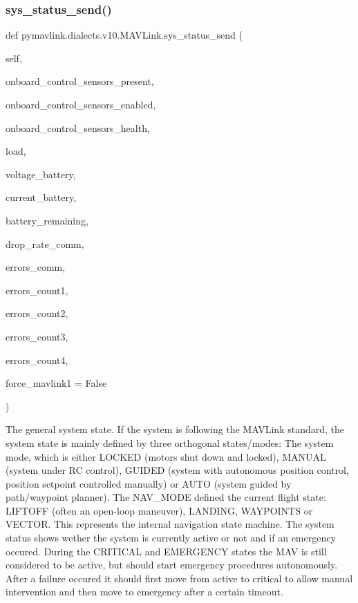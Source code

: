 \begin{DoxyVerb}
\begin{DoxyVerb}
\begin{DoxyVerb}
\begin{DoxyVerb}
\begin{DoxyVerb}
\begin{DoxyVerb}
\begin{DoxyVerb}
\begin{DoxyVerb}
\begin{DoxyVerb}
\begin{DoxyVerb}
\subsubsection{\texorpdfstring{sys\+\_\+status\+\_\+send()}{sys\_status\_send()}}
{\footnotesize\ttfamily def pymavlink.\+dialects.\+v10.\+M\+A\+V\+Link.\+sys\+\_\+status\+\_\+send (\begin{DoxyParamCaption}\item[{}]{self,  }\item[{}]{onboard\+\_\+control\+\_\+sensors\+\_\+present,  }\item[{}]{onboard\+\_\+control\+\_\+sensors\+\_\+enabled,  }\item[{}]{onboard\+\_\+control\+\_\+sensors\+\_\+health,  }\item[{}]{load,  }\item[{}]{voltage\+\_\+battery,  }\item[{}]{current\+\_\+battery,  }\item[{}]{battery\+\_\+remaining,  }\item[{}]{drop\+\_\+rate\+\_\+comm,  }\item[{}]{errors\+\_\+comm,  }\item[{}]{errors\+\_\+count1,  }\item[{}]{errors\+\_\+count2,  }\item[{}]{errors\+\_\+count3,  }\item[{}]{errors\+\_\+count4,  }\item[{}]{force\+\_\+mavlink1 = {\ttfamily False} }\end{DoxyParamCaption})}

\begin{DoxyVerb}The general system state. If the system is following the MAVLink
standard, the system state is mainly defined by three
orthogonal states/modes: The system mode, which is
either LOCKED (motors shut down and locked), MANUAL
(system under RC control), GUIDED (system with
autonomous position control, position setpoint
controlled manually) or AUTO (system guided by
path/waypoint planner). The NAV_MODE defined the
current flight state: LIFTOFF (often an open-loop
maneuver), LANDING, WAYPOINTS or VECTOR. This
represents the internal navigation state machine. The
system status shows wether the system is currently
active or not and if an emergency occured. During the
CRITICAL and EMERGENCY states the MAV is still
considered to be active, but should start emergency
procedures autonomously. After a failure occured it
should first move from active to critical to allow
manual intervention and then move to emergency after a
certain timeout.


\end{DoxyVerb}
\end{DoxyVerb}
\end{DoxyVerb}
\end{DoxyVerb}
\end{DoxyVerb}
\end{DoxyVerb}
\end{DoxyVerb}
\end{DoxyVerb}
\end{DoxyVerb}
\end{DoxyVerb}
\end{DoxyVerb}
